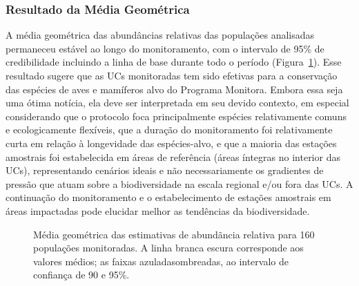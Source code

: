 \documentclass[
  letterpaper,
]{scrbook}
\begin{document}
\subsubsection{Resultado da Média
Geométrica}\label{resultado-da-muxe9dia-geomuxe9trica}

A média geométrica das abundâncias relativas das populações analisadas
permaneceu estável ao longo do monitoramento, com o intervalo de 95\% de
credibilidade incluindo a linha de base durante todo o período
(Figura~\ref{fig-media-geometrica}). Esse resultado sugere que as UCs
monitoradas tem sido efetivas para a conservação das espécies de aves e
mamíferos alvo do Programa Monitora. Embora essa seja uma ótima notícia,
ela deve ser interpretada em seu devido contexto, em especial
considerando que o protocolo foca principalmente espécies relativamente
comuns e ecologicamente flexíveis, que a duração do monitoramento foi
relativamente curta em relação à longevidade das espécies-alvo, e que a
maioria das estações amostrais foi estabelecida em áreas de referência
(áreas íntegras no interior das UCs), representando cenários ideais e
não necessariamente os gradientes de pressão que atuam sobre a
biodiversidade na escala regional e/ou fora das UCs. A continuação do
monitoramento e o estabelecimento de estações amostrais em áreas
impactadas pode elucidar melhor as tendências da biodiversidade.

\begin{figure}[H]


\caption{\label{fig-media-geometrica}Média geométrica das estimativas de
abundãncia relativa para 160 populações monitoradas. A linha branca
escura corresponde aos valores médios; as faixas azuladasombreadas, ao
intervalo de confiança de 90 e 95\%.}

\end{figure}%
\end{document}
